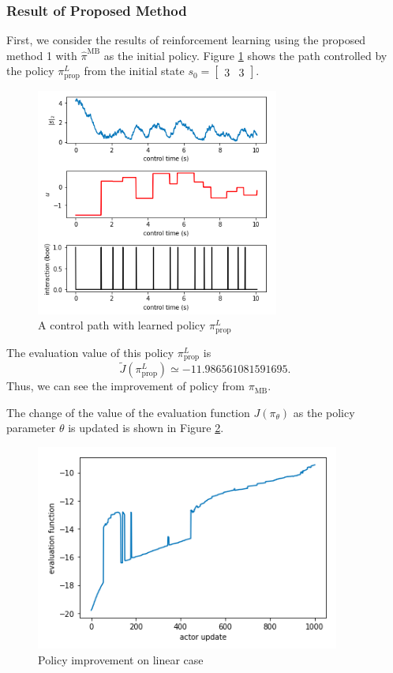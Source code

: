 \documentclass[english, dvipdfmx]{ampmt}             %
\begin{document}
\subsubsection{Result of Proposed Method}
First, we consider the results of reinforcement learning using the proposed method 1 with $\hat{\pi}^{\textrm{MB}}$ as the initial policy. Figure \ref{proposed_1_linear} shows the path controlled by the policy $\pi_{\textrm{prop}}^L$ from the initial state $s_0=\begin{bmatrix}3 & 3\end{bmatrix}$.
\begin{figure}[H]
	\centering
 	\includegraphics[width=8cm]{proposed_1_linear.png}
 	\caption{A control path with learned policy $\pi_{\textrm{prop}}^L$} \label{proposed_1_linear}
\end{figure}
The evaluation value of this policy $\pi_{\textrm{prop}}^L$ is
\begin{equation}
	\tilde{J}(\pi_{\textrm{prop}}^L) \simeq -11.986561081591695.
\end{equation}
Thus, we can see the improvement of policy from $\pi_{\textrm{MB}}$.\par
The change of the value of the evaluation function $J( \pi_{\theta})$ as the policy parameter $\theta$ is updated is shown in Figure \ref{evaluation_log_linear}.
\begin{figure}[H]
	\centering
 	\includegraphics[width=10cm]{evaluation_log_linear.png}
 	\caption{Policy improvement on linear case} \label{evaluation_log_linear}
\end{figure}
\end{document}
